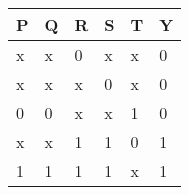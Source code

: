 \begin{tabular}{|p{1cm}|p{1cm}|p{1cm}|p{1cm}|p{1cm}|p{1cm}|}                            
\hline            
P& Q& R& S& T& Y\\       
\hline          
x& x& 0& x& x& 0\\              
\hline       
x& x& x& 0& x& 0\\               
\hline                                          
0& 0& x& x& 1& 0\\                       
\hline                         
x& x& 1& 1& 0& 1\\                    
\hline     
1& 1& 1& 1& x& 1\\           
\hline                                      
\end{tabular}
